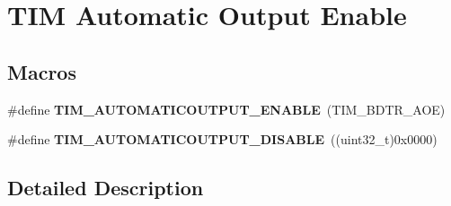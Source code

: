 \hypertarget{group___t_i_m___a_o_e___bit___set___reset}{\section{T\-I\-M Automatic Output Enable}
\label{group___t_i_m___a_o_e___bit___set___reset}
}
\subsection*{Macros}
\begin{DoxyCompactItemize}
\item 
\hypertarget{group___t_i_m___a_o_e___bit___set___reset_ga09e7f3f768b0f122f13fd47771f07ddf}{\#define {\bfseries T\-I\-M\-\_\-\-A\-U\-T\-O\-M\-A\-T\-I\-C\-O\-U\-T\-P\-U\-T\-\_\-\-E\-N\-A\-B\-L\-E}~(T\-I\-M\-\_\-\-B\-D\-T\-R\-\_\-\-A\-O\-E)}\label{group___t_i_m___a_o_e___bit___set___reset_ga09e7f3f768b0f122f13fd47771f07ddf}

\item 
\hypertarget{group___t_i_m___a_o_e___bit___set___reset_ga65b4336dee767fbe8d8cc4f980f6b18e}{\#define {\bfseries T\-I\-M\-\_\-\-A\-U\-T\-O\-M\-A\-T\-I\-C\-O\-U\-T\-P\-U\-T\-\_\-\-D\-I\-S\-A\-B\-L\-E}~((uint32\-\_\-t)0x0000)}\label{group___t_i_m___a_o_e___bit___set___reset_ga65b4336dee767fbe8d8cc4f980f6b18e}

\end{DoxyCompactItemize}


\subsection{Detailed Description}
